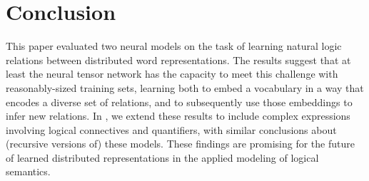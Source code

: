 \section{Conclusion}\label{sec:discussion}

This paper evaluated two neural models on the task of learning 
natural logic relations between distributed word representations. The
results suggest that at least the neural tensor network
has the capacity to
meet this challenge with reasonably-sized training sets, learning both 
to embed a vocabulary in a way that encodes a diverse
set of relations, and to subsequently use those embeddings to infer new
relations. In
\cite{Bowman:Potts:Manning:2014}, we extend these results to include
complex expressions involving logical connectives and quantifiers, with similar
conclusions about (recursive versions of) these models. These findings
are promising for the future of learned distributed representations in the
applied modeling of logical semantics.

%
%
%

